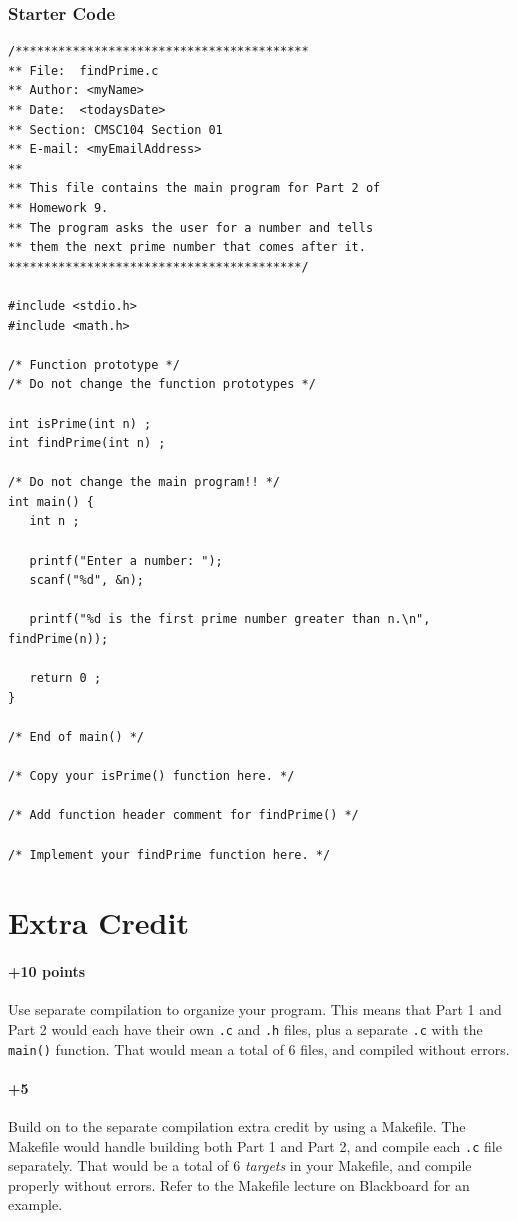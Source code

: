 \documentclass[letter,11pt]{article}
\begin{document}
\subsubsection*{Starter Code}
\begin{verbatim}
/*****************************************
** File:  findPrime.c
** Author: <myName>
** Date:  <todaysDate>
** Section: CMSC104 Section 01
** E-mail: <myEmailAddress>
**
** This file contains the main program for Part 2 of
** Homework 9.
** The program asks the user for a number and tells
** them the next prime number that comes after it.
*****************************************/

#include <stdio.h>
#include <math.h>

/* Function prototype */
/* Do not change the function prototypes */

int isPrime(int n) ;
int findPrime(int n) ;

/* Do not change the main program!! */
int main() {
   int n ;

   printf("Enter a number: ");
   scanf("%d", &n);

   printf("%d is the first prime number greater than n.\n", findPrime(n));

   return 0 ;
}

/* End of main() */

/* Copy your isPrime() function here. */

/* Add function header comment for findPrime() */

/* Implement your findPrime function here. */
\end{verbatim}

\section*{Extra Credit}
\paragraph{+10 points}Use separate compilation to organize your program. This means that Part 1 and Part 2 would each have their own \texttt{.c} and \texttt{.h} files, plus a separate \texttt{.c} with the \texttt{main()} function. That would mean a total of 6 files, and compiled without errors.
\paragraph{+5}Build on to the separate compilation extra credit by using a Makefile. The Makefile would handle building both Part 1 and Part 2, and compile each \texttt{.c} file separately. That would be a total of 6 \textit{targets} in your Makefile, and compile properly without errors. Refer to the Makefile lecture on Blackboard for an example.
\end{document}
